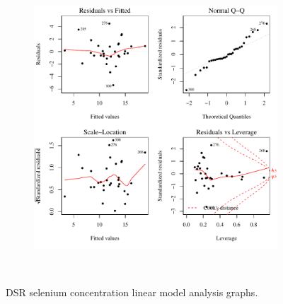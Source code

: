 \begin{landscape}
\begin{figure}
\begin{subfigure}{0.7\textwidth}
			\includegraphics[width=\tableCustomSize]{"Figures/Results_DSR/Stochastic/Conc Model lm-fit WIL"}
		\end{subfigure}\\
		\caption{DSR selenium concentration linear model analysis graphs.}
	\end{figure}
\end{landscape}

